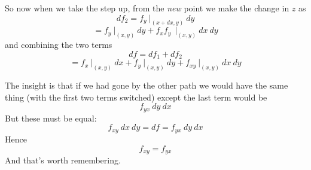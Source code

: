 \documentclass[11pt, oneside]{article}
\begin{document}
So now when we take the step up, from the \emph{new} point we make the change in $z$ as
\[ df_2 =  f_y \ \bigg |_{(x + dx, y)} \ dy \]
\[ = f_y \ \bigg |_{(x, y)} \ dy + f_x f_y \  \ \bigg |_{(x, y)} \ dx \ dy \]
and combining the two terms
\[ df = df_1 + df_2 \]
\[ =   f_x \ \bigg |_{(x, y)} \ dx + f_y \ \bigg |_{(x, y)} \ dy + f_{xy} \ \bigg |_{(x, y)}  \ dx \ dy \]

The insight is that if we had gone by the other path we would have the same thing (with the first two terms switched) except the last term would be
\[  f_{yx} \ dy \ dx \]
But these must be equal:
\[  f_{xy}\ dx \ dy = df = f_{yx} \ dy \ dx \]
Hence
\[  f_{xy} = f_{yx} \]
And that's worth remembering.
\end{document}
